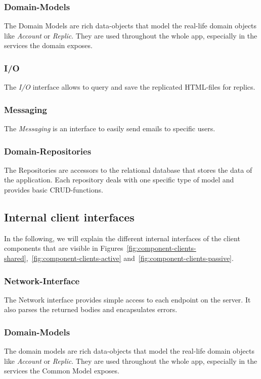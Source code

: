 \subsubsection{Domain-Models}
The Domain Models are rich data-objects that model the real-life domain objects like \textit{Account} or \textit{Replic}.
They are used throughout the whole app, especially in the services the domain exposes.

\subsubsection{I/O}
The \textit{I/O} interface allows to query and save the replicated HTML-files for replics.

\subsubsection{Messaging}
The \textit{Messaging} is an interface to easily send emails to specific users.

\subsubsection{Domain-Repositories}
The Repositories are accessors to the relational database that stores the data of the application. \newline
Each repository deals with one specific type of model and provides basic CRUD-functions.

\subsection{Internal client interfaces}\label{subsec:internal-client-interfaces}
In the following, we will explain the different internal interfaces of the client components that are visible in Figures~\ref{fig:component-clients-shared},~\ref{fig:component-clients-active} and~\ref{fig:component-clients-passive}.

\subsubsection{Network-Interface}
The Network interface provides simple access to each endpoint on the server.
It also parses the returned bodies and encapsulates errors.

\subsubsection{Domain-Models}
The domain models are rich data-objects that model the real-life domain objects like \textit{Account} or \textit{Replic}.
They are used throughout the whole app, especially in the services the Common Model exposes.

